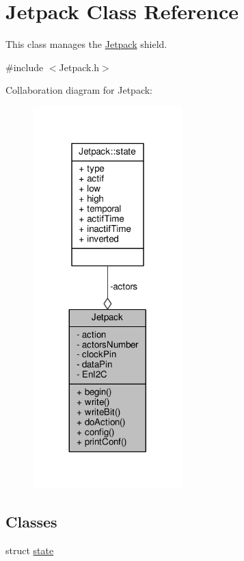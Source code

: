 \hypertarget{classJetpack}{}\section{Jetpack Class Reference}
\label{classJetpack}


This class manages the \hyperlink{classJetpack}{Jetpack} shield.  




{\ttfamily \#include $<$Jetpack.\+h$>$}



Collaboration diagram for Jetpack\+:\nopagebreak
\begin{figure}[H]
\begin{center}
\leavevmode
\includegraphics[width=164pt]{classJetpack__coll__graph}
\end{center}
\end{figure}
\subsection*{Classes}
\begin{DoxyCompactItemize}
\item 
struct \hyperlink{structJetpack_1_1state}{state}
\end{DoxyCompactItemize}
